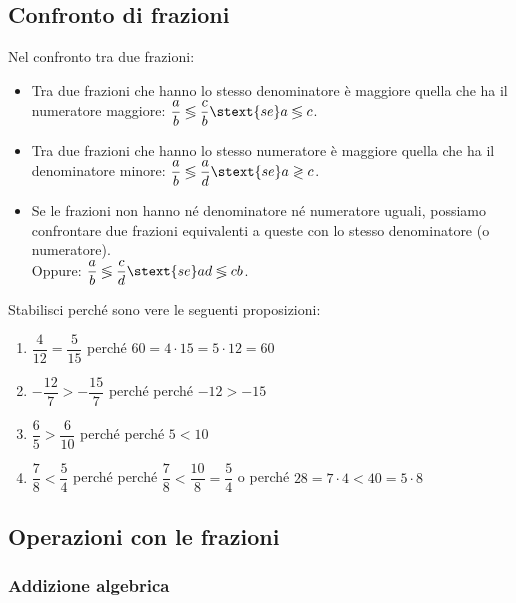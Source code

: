 \subsection{Confronto di frazioni}
\label{sub:razionali_confronto}

\begin{definizione}{}{}
Nel confronto tra due frazioni:

\begin{itemize} [noitemsep]
\item Tra due frazioni che hanno lo stesso denominatore è maggiore quella 
che ha il numeratore maggiore: 
\(\dfrac{a}{b} \lessgtr \dfrac{c}{b} \stext{se} a \lessgtr c\).
\item Tra due frazioni che hanno lo stesso numeratore è maggiore quella 
che ha il denominatore minore: 
\(\dfrac{a}{b} \lessgtr \dfrac{a}{d} \stext{se} a \gtrless c\).
\item Se le frazioni non hanno né denominatore né numeratore uguali, 
possiamo confrontare due frazioni equivalenti a queste con lo stesso 
denominatore (o numeratore).\\
Oppure: \(\dfrac{a}{b} \lessgtr \dfrac{c}{d} \stext{se}
ad \lessgtr cb\).
\end{itemize}
\end{definizione}

\begin{esempio}{}{}
Stabilisci perché sono vere le seguenti proposizioni:
\begin{enumerate} [noitemsep]
\item \(\dfrac{4}{12} = \dfrac{5}{15}\) \qquad perché \quad 
\(60 = 4 \cdot 15 = 5 \cdot 12 = 60\)
\item \(-\dfrac{12}{7} > -\dfrac{15}{7}\) \qquad perché \quad perché 
\(-12 > -15\)
\item \(\dfrac{6}{5} > \dfrac{6}{10}\) \qquad perché \quad perché 
\(5 < 10\)
\item \(\dfrac{7}{8} < \dfrac{5}{4}\) \qquad perché \quad perché 
\(\dfrac{7}{8} < \dfrac{10}{8} = \dfrac{5}{4}\) \quad o perché \quad 
\(28 = 7 \cdot 4 < 40 = 5 \cdot 8\)
\end{enumerate}
\end{esempio}

\subsection{Operazioni con le frazioni}
\label{sub:razionali_operazioni}

\subsubsection{Addizione algebrica}

